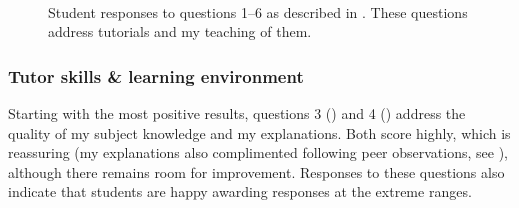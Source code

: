 \begin{figure}
    \quad
    \\
\caption{Student responses to questions 1--6 as described in . These questions address tutorials and my teaching of them.}
  \label{fig:plot-A}
\end{figure}

\subsubsection{Tutor skills \& learning environment}\label{sec:tutor-plus}

Starting with the most positive results, questions 3 () and 4 () address the quality of my subject knowledge and my explanations. Both score highly, which is reassuring (my explanations also complimented following peer observations, see ), although there remains room for improvement. Responses to these questions also indicate that students are happy awarding responses at the extreme ranges.

